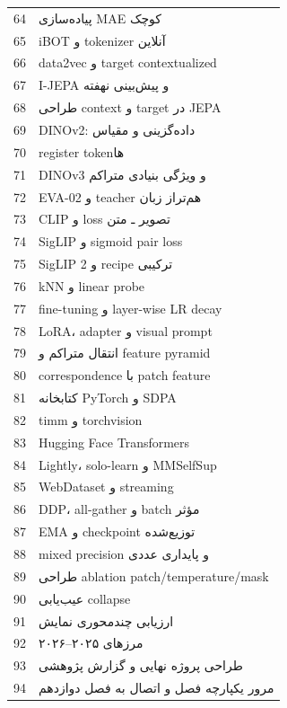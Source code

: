 \documentclass[12pt,openany,oneside]{book}
\begin{document}
\begin{videobox}
\begin{longtable}{p{12mm}p{122mm}}
64 & پیاده‌سازی MAE کوچک \\
65 & iBOT و tokenizer آنلاین \\
66 & data2vec و target contextualized \\
67 & I-JEPA و پیش‌بینی نهفته \\
68 & طراحی context و target در JEPA \\
69 & DINOv2: داده‌گزینی و مقیاس \\
70 & register tokenها \\
71 & DINOv3 و ویژگی بنیادی متراکم \\
72 & EVA-02 و teacher هم‌تراز زبان \\
73 & CLIP و loss تصویر ـ متن \\
74 & SigLIP و sigmoid pair loss \\
75 & SigLIP 2 و recipe ترکیبی \\
76 & kNN و linear probe \\
77 & fine-tuning و layer-wise LR decay \\
78 & LoRA، adapter و visual prompt \\
79 & انتقال متراکم و feature pyramid \\
80 & correspondence با patch feature \\
81 & کتابخانه PyTorch و SDPA \\
82 & timm و torchvision \\
83 & Hugging Face Transformers \\
84 & Lightly، solo-learn و MMSelfSup \\
85 & WebDataset و streaming \\
86 & DDP، all-gather و batch مؤثر \\
87 & EMA و checkpoint توزیع‌شده \\
88 & mixed precision و پایداری عددی \\
89 & طراحی ablation patch/temperature/mask \\
90 & عیب‌یابی collapse \\
91 & ارزیابی چندمحوری نمایش \\
92 & مرزهای ۲۰۲۵--۲۰۲۶ \\
93 & طراحی پروژه نهایی و گزارش پژوهشی \\
94 & مرور یکپارچه فصل و اتصال به فصل دوازدهم \\
\bottomrule
\end{longtable}
\end{videobox}
\end{document}
